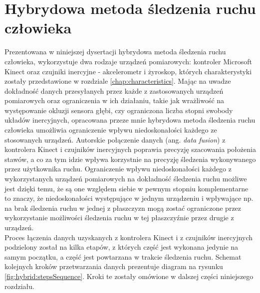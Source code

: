 \chapter{Hybrydowa metoda śledzenia ruchu człowieka}\label{chap:hybrid}

Prezentowana w niniejszej dysertacji hybrydowa metoda śledzenia ruchu człowieka, wykorzystuje dwa rodzaje urządzeń pomiarowych: kontroler Microsoft Kinect oraz czujniki inercyjne - akcelerometr i żyroskop, których charakterystyki zostały przedstawione w rozdziale \ref{chap:characteristics}. Mając na uwadze dokładność danych przesyłanych przez każde z zastosowanych urządzeń pomiarowych oraz ograniczenia w ich działaniu, takie jak wrażliwość na występowanie okluzji sensora głębi, czy ograniczona liczba stopni swobody układów inercyjnych, opracowana przeze mnie hybrydowa metoda śledzenia ruchu człowieka umożliwia ograniczenie wpływu niedoskonałości każdego ze stosowanych urządzeń. Autorskie połączenie danych (ang. \textsl{data fusion}) z kontrolera Kinect i czujników inercyjnych poprawia precyzję szacowania położenia stawów, a co za tym idzie wpływa korzystnie na precyzję śledzenia wykonywanego przez użytkownika ruchu. Ograniczenie wpływu niedoskonałości każdego z wykorzystanych urządzeń pomiarowych na dokładność śledzenia ruchu możliwe jest dzięki temu, że są one względem siebie w pewnym stopniu komplementarne to znaczy, że niedoskonałości występujące w jednym urządzeniu i wpływające np. na brak śledzenia ruchu w jednej z płaszczyzn mogą zostać ograniczone przez wykorzystanie możliwości śledzenia ruchu w tej płaszczyźnie przez drugie z urządzeń.\\
Proces łączenia danych uzyskanych z kontrolera Kinect i z czujników inercyjnych podzielony został na kilka etapów, z których część jest wykonana jedynie na samym początku, a część jest powtarzana w trakcie śledzenia ruchu. Schemat kolejnych kroków przetwarzania danych prezentuje diagram na rysunku \ref{fig:hybrid:stepsSequence}. Kroki te zostały omówione w dalszej części niniejszego rozdziału.\\

